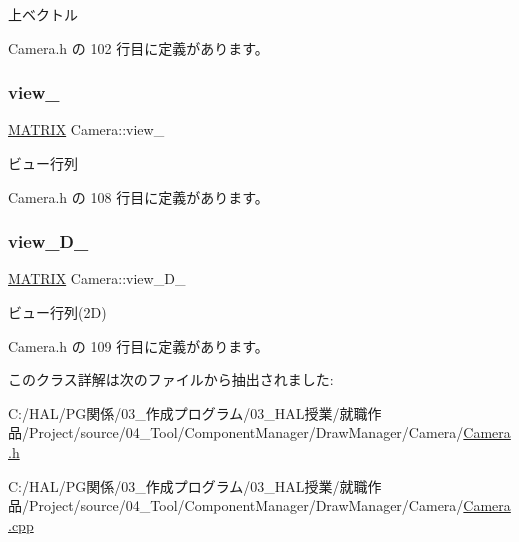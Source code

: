 上ベクトル 



 Camera.\+h の 102 行目に定義があります。

\mbox{\label{class_camera_a5839ccb2cd4931e904a7a6cd412260ad}} 
\subsubsection{\texorpdfstring{view\+\_\+}{view\_}}
{\footnotesize\ttfamily \mbox{\hyperlink{_vector3_d_8h_a032295cd9fb1b711757c90667278e744}{M\+A\+T\+R\+IX}} Camera\+::view\+\_\+\hspace{0.3cm}{\ttfamily [private]}}



ビュー行列 



 Camera.\+h の 108 行目に定義があります。

\mbox{\label{class_camera_af6dbadc718d75c621fec94b76365ca57}} 
\subsubsection{\texorpdfstring{view\+\_\+D\+\_\+}{view\_2D\_}}
{\footnotesize\ttfamily \mbox{\hyperlink{_vector3_d_8h_a032295cd9fb1b711757c90667278e744}{M\+A\+T\+R\+IX}} Camera\+::view\+\_\+D\+\_\+\hspace{0.3cm}{\ttfamily [private]}}



ビュー行列(2\+D) 



 Camera.\+h の 109 行目に定義があります。



このクラス詳解は次のファイルから抽出されました\+:\begin{DoxyCompactItemize}
\item 
C\+:/\+H\+A\+L/\+P\+G関係/03\+\_\+作成プログラム/03\+\_\+\+H\+A\+L授業/就職作品/\+Project/source/04\+\_\+\+Tool/\+Component\+Manager/\+Draw\+Manager/\+Camera/\mbox{\hyperlink{_camera_8h}{Camera.\+h}}\item 
C\+:/\+H\+A\+L/\+P\+G関係/03\+\_\+作成プログラム/03\+\_\+\+H\+A\+L授業/就職作品/\+Project/source/04\+\_\+\+Tool/\+Component\+Manager/\+Draw\+Manager/\+Camera/\mbox{\hyperlink{_camera_8cpp}{Camera.\+cpp}}\end{DoxyCompactItemize}
